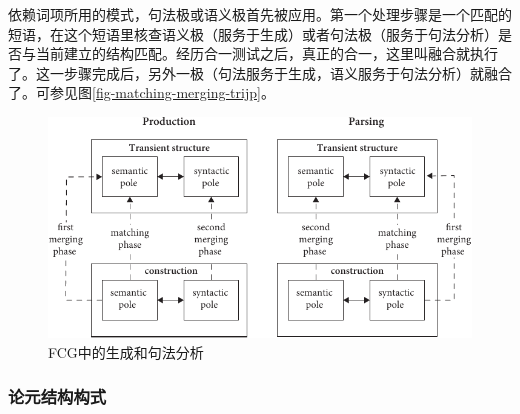 \z
依赖词项所用的模式，句法极或语义极首先被应用。第一个处理步骤是一个匹配的短语，在这个短语里核查语义极（服务于生成）或者句法极（服务于句法分析）是否与当前建立的结构匹配。经历合一测试之后，真正的合一，这里叫融合就执行了。这一步骤完成后，另外一极（句法服务于生成，语义服务于句法分析）就融合了。可参见图\vref{fig-matching-merging-trijp}。

\begin{figure}
\includegraphics[width=.98\textwidth]{Figures/production-parsing-fcg.pdf}
\caption{\label{fig-matching-merging-trijp}FCG中的生成和句法分析\citep[]{vanTrijp2013a}}
\end{figure}%

\subsubsection{论元结构构式}

